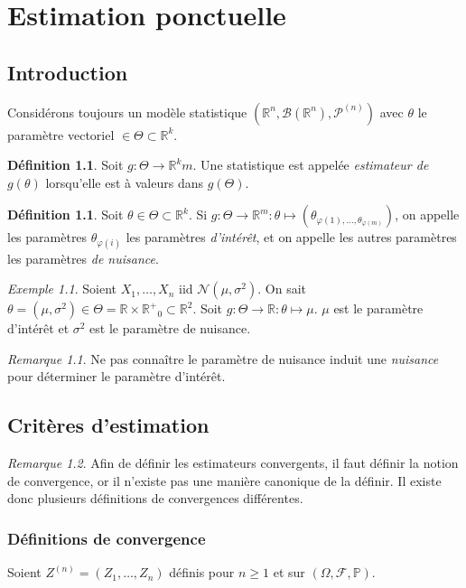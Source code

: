 \documentclass{report}
\renewcommand{\P}{\mathbb P}
\newcommand{\statmod}[4]{\left(#1^{#4}, #2\left(#1^{#4}\right), #3^{\left(#4\right)}\right)}
\newcommand{\probspace}[3]{\left(#1, #2, #3\right)}
\newcommand{\Nms}{\mathcal N(\mu, \sigma^2)}
\newcommand{\R}{\mathbb R}
\newcommand{\Rp}{{\mathbb R^+}}
\newcommand{\Brl}{\mathcal B}  %
\theoremstyle{definition}
\newtheorem{déf}[thm]{Définition}
\theoremstyle{remark}
\newtheorem*{rmq}{Remarque}
\newtheorem{ex}{Exemple}[chapter]
\begin{document}
\chapter{Estimation ponctuelle}
	\section{Introduction}
		Considérons toujours un modèle statistique $\statmod \R\Brl{\mathcal P}n$ avec $\theta$ le paramètre vectoriel $\in \Theta \subset \R^k$.
		
		\begin{déf} Soit $g : \Theta \to \R^km$. Une statistique est appelée \textit{estimateur de $g(\theta)$} lorsqu'elle est à valeurs dans $g(\Theta)$.
		\end{déf}
		
		\begin{déf} Soit $\theta \in \Theta \subset \R^k$. Si $g : \Theta \to \R^m : \theta \mapsto (\theta_{\varphi(1), \ldots, \theta_{\varphi(m)}})$, on
		appelle les paramètres $\theta_{\varphi(i)}$ les paramètres \textit{d'intérêt}, et on appelle les autres paramètres les paramètres \textit{de nuisance}.
		\end{déf}
		
		\begin{ex} Soient $X_1, \ldots, X_n$ iid $\Nms$. On sait $\theta = (\mu, \sigma^2) \in \Theta = \R \times \Rp_0 \subset \R^2$.
		Soit $g : \Theta \to \R : \theta \mapsto \mu$. $\mu$ est le paramètre d'intérêt et $\sigma^2$ est le paramètre de nuisance.
		\end{ex}
		
		\begin{rmq} Ne pas connaître le paramètre de nuisance induit une \textit{nuisance} pour déterminer le paramètre d'intérêt.
		\end{rmq}
		
	\section{Critères d'estimation}
			\begin{rmq} Afin de définir les estimateurs convergents, il faut définir la notion de convergence, or il n'existe pas une manière canonique de la définir.
			Il existe donc plusieurs définitions de convergences différentes.
			\end{rmq}
		
		\subsection{Définitions de convergence}
			Soient $Z^{(n)} = (Z_1, \ldots, Z_n)$ définis pour $n \geq 1$ et sur $\probspace \Omega{\mathcal F}\P$.
		
\end{document}
